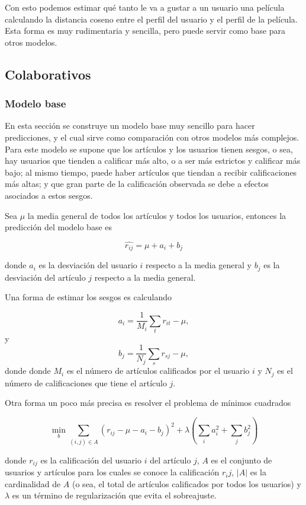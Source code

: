 Con esto podemos estimar qué tanto le va a gustar a un usuario una película calculando la distancia coseno entre el perfil del usuario y el perfil de la película. Esta forma es muy rudimentaria y sencilla, pero puede servir como base para otros modelos.

\subsection{Colaborativos}

\subsubsection{Modelo base} \label{sec:modelo_base}

En esta sección se construye un modelo base muy sencillo para hacer predicciones, y el cual sirve como comparación con otros modelos más complejos. Para este modelo se supone que los artículos y los usuarios tienen sesgos, o sea, hay usuarios que tienden a calificar más alto, o a ser más estrictos y calificar más bajo; al mismo tiempo, puede haber artículos que tiendan a recibir calificaciones más altas; y que gran parte de la calificación observada se debe a efectos asociados a estos sesgos.

Sea $\mu$ la media general de todos los artículos y todos los usuarios, entonces la predicción del modelo base es

\[
\hat{r_{ij}} = \mu + a_i + b_j
\]

donde $a_i$ es la desviación del usuario $i$ respecto a la media general y $b_j$ es la desviación del artículo $j$ respecto a la media general.

Una forma de estimar los sesgos es calculando

\[
a_i = \frac{1}{M_i} \sum_t r_{it} - \mu,
\]
y 
\[
b_j = \frac{1}{N_j} \sum_s r_{sj} - \mu,
\]
donde donde $M_i$ es el número de artículos calificados por el usuario $i$ y $N_j$ es el número de calificaciones que tiene el artículo $j$.

Otra forma un poco más precisa es resolver el problema de mínimos cuadrados

\[
\min_{b} \sum_{(i, j) \in A} \left( r_{ij} - \mu - a_i - b_j \right) ^2 + \lambda \left( \sum_{i} a_i^2 + \sum_{j} b_j^2 \right)
\]

donde $r_{ij}$ es la calificación del usuario $i$ del artículo $j$, $A$ es el conjunto de usuarios y artículos para los cuales se conoce la calificación $r_ij$, $ \vert A \vert$ es la cardinalidad de $A$ (o sea, el total de artículos calificados por todos los usuarios) y $\lambda$ es un término de regularización que evita el sobreajuste.


